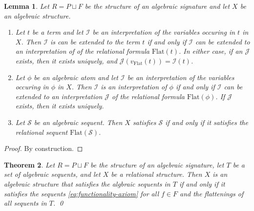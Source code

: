 \documentclass[a4paper]{article}
\newtheorem{theorem}{Theorem}
\newtheorem{lemma}[theorem]{Lemma}
\theoremstyle{remark}
\theoremstyle{definition}
\begin{document}
\begin{lemma}
  \label{lem:flattening-versus-interpretation}
  Let $R = P \sqcup F$ be the structure of an algebraic signature and let $X$ be an algebraic structure.
  \begin{enumerate}
    \item
      Let $t$ be a term and let $\mathcal{I}$ be an interpretation of the variables occuring in $t$ in $X$.
      Then $\mathcal{I}$ is can be extended to the term $t$ if and only if $\mathcal{I}$ can be extended to an interpretation of of the relational formula $\mathrm{Flat}(t)$.
      In either case, if  an $\mathcal{J}$ exists, then it exists uniquely, and $\mathcal{J}(v_\mathrm{Flat}(t)) = \mathcal{I}(t)$.
    \item
      Let $\phi$ be an algebraic atom and let $\mathcal{I}$ be an interpretation of the variables occuring in $\phi$ in $X$.
      Then $\mathcal{I}$ is an interpretation of $\phi$ if and only if $\mathcal{I}$ can be extended to an interpretation $\mathcal{J}$ of the relational formula $\mathrm{Flat}(\phi)$.
      If $\mathcal{J}$ exists, then it exists uniquely.
    \item
      Let $\mathcal{S}$ be an algebraic sequent.
      Then $X$ satisfies $\mathcal{S}$ if and only if it satisfies the relational sequent $\mathrm{Flat}(\mathcal{S})$.
  \end{enumerate}
\end{lemma}
\begin{proof}
  By construction.
\end{proof}

\begin{theorem}
  Let $R = P \sqcup F$ be the structure of an algebraic signature, let $T$ be a set of algebraic sequents, and let $X$ be a relational structure.
  Then $X$ is an algebraic structure that satisfies the algbraic sequents in $T$ if and only if it satisfies the sequents \eqref{eq:functionality-axiom} for all $f \in F$ and the flattenings of all sequents in $T$.
  \qed
\end{theorem}
\end{document}
